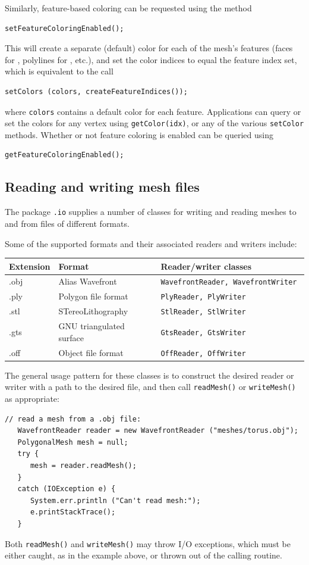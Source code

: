 Similarly, feature-based coloring can be requested using the method
%
\begin{lstlisting}[]
   setFeatureColoringEnabled();
\end{lstlisting}
%
This will create a separate (default) color for each of the mesh's
features (faces for 
, polylines for
, etc.),
and set the color indices to equal the feature 
index set, which is equivalent to the call
%
\begin{lstlisting}[]
   setColors (colors, createFeatureIndices());
\end{lstlisting}
%
where {\tt colors} contains a default color for each feature.
Applications can query or set the colors
for any vertex using {\tt getColor(idx)}, or any of the
various {\tt setColor} methods. Whether or not feature coloring
is enabled can be queried using
%
\begin{lstlisting}[]
   getFeatureColoringEnabled();
\end{lstlisting}
%

\subsection{Reading and writing mesh files}
\label{MeshFileIO:sec}

The package {\tt \mgeo.io} supplies a number of classes for
writing and reading meshes to and from files of different formats.

Some of the supported formats and their associated readers and writers
include:

\begin{tabular}{|lll|}
\hline
Extension & Format & Reader/writer classes \\
\hline
.obj & Alias Wavefront & \tt WavefrontReader, WavefrontWriter \\
.ply & Polygon file format & \tt PlyReader, PlyWriter \\
.stl & STereoLithography & \tt StlReader, StlWriter \\
.gts & GNU triangulated surface & \tt GtsReader, GtsWriter \\
.off & Object file format & \tt OffReader, OffWriter \\
\hline
\end{tabular}

The general usage pattern for these classes is to construct the
desired reader or writer with a path to the desired file, and then
call {\tt readMesh()} or {\tt writeMesh()} as appropriate:
%
\begin{lstlisting}[]
   // read a mesh from a .obj file:
   WavefrontReader reader = new WavefrontReader ("meshes/torus.obj");
   PolygonalMesh mesh = null;
   try {
      mesh = reader.readMesh();
   }
   catch (IOException e) {
      System.err.println ("Can't read mesh:");
      e.printStackTrace();
   }
\end{lstlisting}
%
Both {\tt readMesh()} and {\tt writeMesh()} may throw I/O exceptions,
which must be either caught, as in the example above, or
thrown out of the calling routine.

